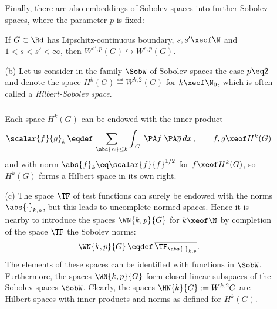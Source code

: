 \documentclass[11pt,twoside]{article}
\def\G{G}
\begin{document}
\begin{itemize}[leftmargin=12pt,itemsep=5pt]
\begin{itemize}[leftmargin=17pt]
\subparagraph{} %
Finally,
there are also embeddings of Sobolev spaces into further Sobolev spaces,
where the parameter $p$ is fixed:

\begin{theorem1}\label{I_SOBOLEV_EMBEDDING_THEOREM_3}
If $\G \subset \Rd$ has Lipschitz-continuous boundary,
$s,s' \xeof \N$ and $1 < s < s' < \infty$,
then $W^{s',p}(\G) \hookrightarrow W^{s,p}(\G)$.
\end{theorem1}

\item[(b)] Let us consider in the family $\SobW$ of Sobolev spaces
the case $p \eq 2$ and denote the space $H^k(\G) \eqdef W^{k,2}(\G)$
for $k \xeof \N_0$,
which is often called a \textit{Hilbert-Sobolev space}.

\subparagraph{} %
Each space $H^k(\G)$ can be endowed with the inner product
\[
\scalar{f}{g}_k \, \eqdef \,
\sum_{\abs{\alpha} \leq k} \int_{\,\G} \;
\PA f \; \PA \overline{g} \, dx\,,
\quad \quad f,g \xeof H^k(\G)
\]
and with norm
$\abs{f} _k \eq \scalar{f}{f}^{1/2}$ for $f \xeof H^k(\G)$,
so $H^k(\G)$ forms a Hilbert space in its own right.

\item[(c)] The space $\TF$ of test functions can surely be endowed
with the norms $\abs{\cdot} _{k,p}$,
but this leads to uncomplete normed spaces.
Hence it is nearby to introduce the spaces $\WN{k,p}{\G}$ for $k \xeof \N$
by completion of the space $\TF$ {\wrt} the Sobolev norms:
\[
\WN{k,p}{\G} \, \eqdef \, \overline{\TF_{\abs{\cdot} _{k,p}}}.
\]
The elements of these spaces can be identified with functions in $\SobW$.
Furthermore,
the spaces $\WN{k,p}{\G}$ form closed linear subspaces
of the Sobolev spaces $\SobW$.
Clearly,
the spaces $\HN{k}{\G} := W^{k,2}{\G}$ are Hilbert spaces
with inner products and norms as defined for $H^k(\G)$.
\end{itemize}
\end{itemize}

\end{document}
